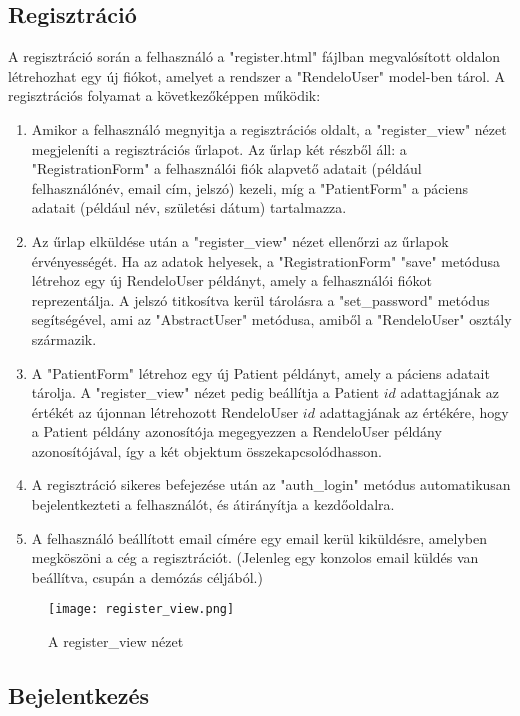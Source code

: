\subsection{Regisztráció}

A regisztráció során a felhasználó a "register.html" fájlban megvalósított oldalon létrehozhat egy új fiókot, amelyet a rendszer a "RendeloUser" model-ben tárol. A regisztrációs folyamat a következőképpen működik:

\begin{enumerate}
	\item Amikor a felhasználó megnyitja a regisztrációs oldalt, a "register\_view" nézet megjeleníti a regisztrációs űrlapot. Az űrlap két részből áll: a "RegistrationForm" a felhasználói fiók alapvető adatait (például felhasználónév, email cím, jelszó) kezeli, míg a "PatientForm" a páciens adatait (például név, születési dátum) tartalmazza.
	\item Az űrlap elküldése után a "register\_view" nézet ellenőrzi az űrlapok érvényességét. Ha az adatok helyesek, a "RegistrationForm" "save" metódusa létrehoz egy új RendeloUser példányt, amely a felhasználói fiókot reprezentálja. A jelszó titkosítva kerül tárolásra a "set\_password" metódus segítségével, ami az "AbstractUser" metódusa, amiből a "RendeloUser" osztály származik.
	\item A "PatientForm" létrehoz egy új Patient példányt, amely a páciens adatait tárolja. A "register\_view" nézet pedig beállítja a Patient $id$ adattagjának az értékét az újonnan létrehozott RendeloUser $id$ adattagjának az értékére, hogy a Patient példány azonosítója megegyezzen a RendeloUser példány azonosítójával, így a két objektum összekapcsolódhasson.
	\item A regisztráció sikeres befejezése után az "auth\_login" metódus automatikusan bejelentkezteti a felhasználót, és átirányítja a kezdőoldalra.
	\item A felhasználó beállított email címére egy email kerül kiküldésre, amelyben megköszöni a cég a regisztrációt. (Jelenleg egy konzolos email küldés van beállítva, csupán a demózás céljából.)
\end{enumerate}

\begin{figure}[H]
	\caption{A register\_view nézet}
	\label{fig:registerview}
	\centering
	\texttt{[image: register\_view.png]}
\end{figure}

\subsection{Bejelentkezés}

